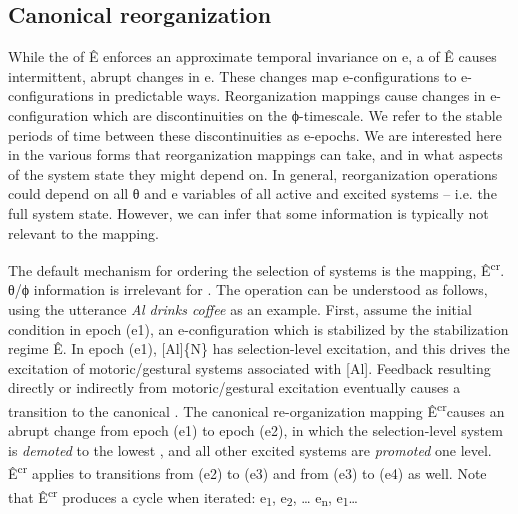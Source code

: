 \subsection{Canonical reorganization}

While the  of Ê enforces an approximate temporal invariance on e, a  of Ê causes intermittent, abrupt changes in e. These changes map e-configurations to e-configurations in predictable ways. Reorganization mappings cause changes in e-configuration which are discontinuities on the ϕ-timescale. We refer to the stable periods of time between these discontinuities as e-epochs. We are interested here in the various forms that reorganization mappings can take, and in what aspects of the system state they might depend on. In general, reorganization operations could depend on all θ and e variables of all active and excited systems -- i.e. the full system state. However, we can infer that some information is typically not relevant to the mapping. 

  The default mechanism for ordering the selection of systems is the  mapping, Ê\textsuperscript{cr}. θ/ϕ information is irrelevant for . The operation  can be understood as follows, using the utterance \textit{Al drinks coffee} as an example. First, assume the initial condition in epoch (e1), an e-configuration which is stabilized by the stabilization regime Ê. In epoch (e1), [Al]\{N\} has selection-level excitation, and this drives the excitation of motoric/gestural systems associated with [Al]. Feedback resulting directly or indirectly from motoric/gestural excitation eventually causes a transition to the canonical . The canonical re-organization mapping Ê\textsuperscript{cr}\linebreak causes an abrupt change from epoch (e1) to epoch (e2), in which the selection-level system is \textit{demoted} to the lowest , and all other excited systems are \textit{promoted} one level. Ê\textsuperscript{cr} applies to transitions from (e2) to (e3) and from (e3) to (e4) as well. Note that Ê\textsuperscript{cr} produces a cycle when iterated: e\textsubscript{1}, e\textsubscript{2}, … e\textsubscript{n}, e\textsubscript{1}… 

